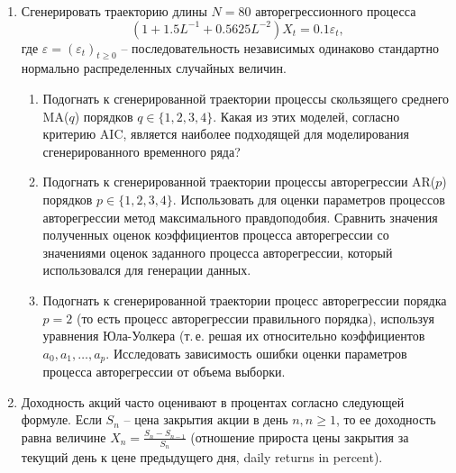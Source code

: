 \documentclass[a4paper,14pt]{extreport}
\renewcommand{\=}[1]{\stackrel{#1}{=}} %
\newcommand{\generaltime}{t \geqslant 0}
\newcommand{\newprocess}[1]{
	\ensuremath{
		#1 = \left(#1 _t\right)_{\generaltime}
	}
}
\begin{document}
\begin{enumerate}
	\item Сгенерировать траекторию длины $N = 80$ авторегрессионного процесса
	\[
	(1 + 1.5 L^{-1} + 0.5625 L^{-2}) X_t = 0.1 \varepsilon_t,
	\]
	где $\newprocess{\varepsilon}$ -- последовательность 
 	независимых одинаково стандартно нормально распределенных случайных величин.
	\begin{enumerate}
	\item Подогнать к сгенерированной траектории процессы
	скользящего среднего MA($q$) порядков $q \in \{1, 2, 3, 4\}$.
	Какая из этих моделей, согласно критерию AIC, является 
	наиболее подходящей для моделирования сгенерированного временного ряда?
	

	\item Подогнать к сгенерированной траектории процессы авторегрессии AR($p$)
	порядков $p \in \{1,2,3,4\}$. Использовать для оценки параметров
	процессов авторегрессии метод максимального правдоподобия.
	Сравнить значения полученных оценок коэффициентов процесса
	авторегрессии со значениями оценок заданного процесса авторегрессии, который
	использовался для генерации данных.


	\item Подогнать к сгенерированной траектории процесс
	авторегрессии порядка $p = 2$ (то есть процесс авторегрессии
	правильного порядка), используя уравнения Юла-Уолкера (т.\,е. решая их
	относительно коэффициентов $a_0, a_1, \ldots, a_p$.
	Исследовать зависимость ошибки оценки параметров процесса
	авторегрессии от объема выборки.



	\end{enumerate}


 

	\item Доходность акций часто оценивают в процентах согласно следующей формуле.
	Если $S_n$ -- цена закрытия акции в день $n, n \geqslant 1$, то ее доходность равна величине
	$X_n = \frac{S_n - S_{n-1}}{S_n}$ (отношение прироста цены закрытия
	за текущий день к цене предыдущего дня, daily returns in percent). 


\end{enumerate}
\end{document}
